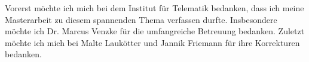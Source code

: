 Vorerst möchte ich mich bei dem Institut für Telematik bedanken, dass ich meine Masterarbeit zu diesem spannenden Thema verfassen durfte.
Insbesondere möchte ich Dr. Marcus Venzke für die umfangreiche Betreuung bedanken.
Zuletzt möchte ich mich bei Malte Laukötter und Jannik Friemann für ihre Korrekturen bedanken.

